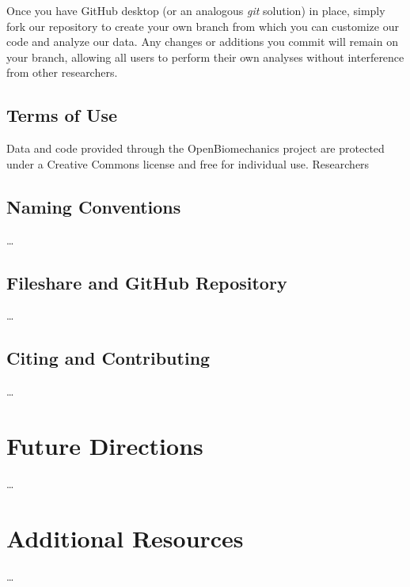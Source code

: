 \documentclass[
]{article}
\begin{document}
Once you have GitHub desktop (or an analogous \textit{git} solution) in place, simply fork our repository to create your own branch from which you can customize our code and analyze our data. Any changes or additions you commit will remain on your branch, allowing all users to perform their own analyses without interference from other researchers.

\hypertarget{terms-of-use}{%
\subsection{Terms of Use}\label{terms-of-use}}

Data and code provided through the OpenBiomechanics project are protected under a Creative Commons license and free for individual use. Researchers

\hypertarget{naming-conventions}{%
\subsection{Naming Conventions}\label{naming-conventions}}

\ldots{}

\hypertarget{fileshare-and-github-repository}{%
\subsection{Fileshare and GitHub Repository}\label{fileshare-and-github-repository}}

\ldots{}

\hypertarget{citing-and-contributing}{%
\subsection{Citing and Contributing}\label{citing-and-contributing}}

\ldots{}

\hypertarget{future-directions}{%
\section{Future Directions}\label{future-directions}}

\ldots{}

\hypertarget{additional-resources}{%
\section{Additional Resources}\label{additional-resources}}

\ldots{}

\newpage
\singlespacing
{}


\end{document}
